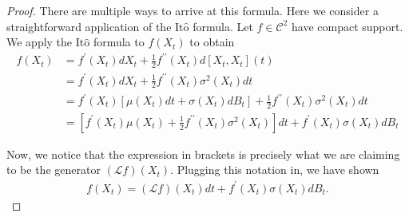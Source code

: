 \documentclass[12pt]{article}
\newcommand{\state}[1][t]{X_{#1}}
\newcommand{\BM}[1][t]{B_{#1}} %
\newcommand{\gen}{\mathcal{L}} %
\newcommand{\ito}{\text{It}\hat{\text{o}}}
\begin{document}
\begin{proof} 
There are multiple ways to arrive at this formula. Here we consider a straightforward application of the $\ito$ formula. Let $f \in \mathcal{C}^2$ have compact support. 
We apply the $\ito$ formula to $f(\state)$ to obtain 
\begin{align*}
f(\state)
&= f^\prime(\state) d\state + \frac{1}{2} f^{\prime\prime}(\state) d[\state, \state](t) \\
&= f^\prime(\state) d\state + \frac{1}{2} f^{\prime\prime}(\state) \sigma^2(\state) dt \\
&= f^\prime(\state) \left[\mu(\state) dt + \sigma(\state) d\BM \right] + \frac{1}{2} f^{\prime\prime}(\state) \sigma^2(\state) dt \\
&= \left[f^\prime(\state)\mu(\state) +  \frac{1}{2} f^{\prime\prime}(\state) \sigma^2(\state) \right] dt + f^\prime(\state) \sigma(\state) d\BM
\end{align*}

Now, we notice that the expression in brackets is precisely what we are claiming to be the generator $(\gen f)(\state)$. Plugging this notation in, we have shown
\begin{align}
f(\state) = (\gen f)(\state) dt +  f^\prime(\state) \sigma(\state) d\BM. \label{Ito_formula_generator}
\end{align}


\end{proof}
\end{document}
